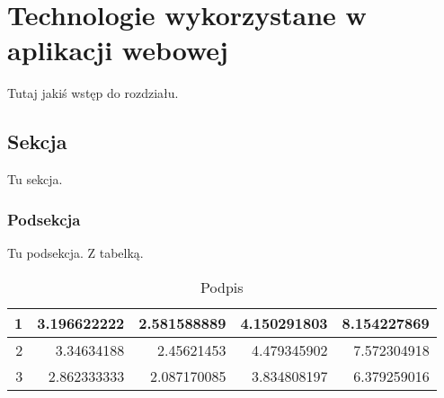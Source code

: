 \chapter{Technologie wykorzystane w aplikacji webowej}

Tutaj jakiś wstęp do rozdziału.

\section{Sekcja}

Tu sekcja.

\subsection{Podsekcja}

Tu podsekcja. Z tabelką.
\begin{table}[H]
    \centering 
    \begin{tabular}{|r|r|r|r|r|}
        \hline
        1 & 3.196622222 & 2.581588889 & 4.150291803 & 8.154227869 \\ \hline
        2 & 3.34634188  & 2.45621453  & 4.479345902 & 7.572304918 \\ \hline
        3 & 2.862333333 & 2.087170085 & 3.834808197 & 6.379259016 \\ \hline
    \end{tabular}
    \caption{Podpis}
    \label{tab:my-table}
\end{table}


